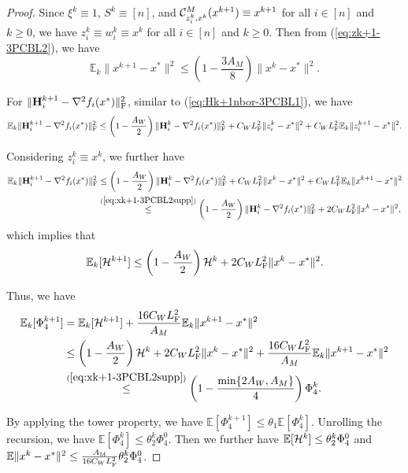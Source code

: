 \documentclass[11pt]{article}
\begin{document}
	
	\begin{proof}
		
		Since $\xi^k\equiv 1$, $S^k \equiv [n]$, and ${\mathcal{C}}^M_{z_i^k, x^k}(x^{k+1}) \equiv x^{k+1}$ for all $i\in [n]$ and $k\geq 0$, we have $z_i^k \equiv w_i^k \equiv x^k$ for all $i\in [n]$ and $k\geq 0$. Then from (\ref{eq:zk+1-3PCBL2}), we have 
		\begin{equation}\label{eq:xk+1-3PCBL2supp}
			\mathbb{E}_k\|x^{k+1}-x^*\|^2 \leq \left(  1 - \frac{3A_M}{8}  \right) \|x^k-x^*\|^2. 
		\end{equation}
		
		
		For $\|\mathbf{H}_i^{k+1} - \nabla^2 f_i(x^*)\|_{\rm F}^2$, similar to (\ref{eq:Hk+1nbor-3PCBL1}), we have 
		$$
		\mathbb{E}_k \|\mathbf{H}_i^{k+1} - \nabla^2 f_i(x^*)\|_{\rm F}^2 \leq \left(  1 - \frac{A_W}{2}  \right) \|\mathbf{H}_i^k - \nabla^2 f_i(x^*)\|_{\rm F}^2 + C_W L_{\rm F}^2 \|z_i^k-x^*\|^2 + C_W L_{\rm F}^2 \mathbb{E}_k\|z_i^{k+1}-x^*\|^2. 
		$$
		
		Considering $z_i^k \equiv x^k$, we further have 
		\begin{align*}
			\mathbb{E}_k \|\mathbf{H}_i^{k+1} - \nabla^2 f_i(x^*)\|_{\rm F}^2 & \leq \left(  1 - \frac{A_W}{2}  \right) \|\mathbf{H}_i^k - \nabla^2 f_i(x^*)\|_{\rm F}^2 + C_W L_{\rm F}^2 \|x^k-x^*\|^2 + C_W L_{\rm F}^2 \mathbb{E}_k\|x^{k+1}-x^*\|^2 \\ 
			& \overset{(\ref{eq:xk+1-3PCBL2supp})}{\leq} \left(  1 - \frac{A_W}{2}  \right) \|\mathbf{H}_i^k - \nabla^2 f_i(x^*)\|_{\rm F}^2 + 2 C_W L_{\rm F}^2 \|x^k-x^*\|^2, 
		\end{align*}
		which implies that 
		\begin{equation}\label{eq:Gk+1-3PCBL2}
			\mathbb{E}_k [{\cal H}^{k+1}] \leq \left(  1 - \frac{A_W}{2}  \right) {\cal H}^k + 2C_WL_{\rm F}^2 \|x^k-x^*\|^2. 
		\end{equation}
		
		
		Thus, we have 
		\begin{align*}
			\mathbb{E}_k[\Phi_4^{k+1}] & = \mathbb{E}_k [{\cal H}^{k+1}] + \frac{16C_WL_{\rm F}^2}{A_M} \mathbb{E}_k\|x^{k+1}-x^*\|^2 \\ 
			& \leq \left(  1 - \frac{A_W}{2}  \right) {\cal H}^k + 2C_WL_{\rm F}^2 \|x^k-x^*\|^2 + \frac{16C_WL_{\rm F}^2}{A_M} \mathbb{E}_k\|x^{k+1}-x^*\|^2 \\ 
			& \overset{(\ref{eq:xk+1-3PCBL2supp})}{\leq} \left(  1 - \frac{\min\{  2A_W, A_M  \}}{4}  \right) \Phi_4^k. 
		\end{align*}
		
		By applying the tower property, we have $\mathbb{E}[\Phi_4^{k+1}] \leq \theta_1 \mathbb{E}[\Phi_4^k]$. Unrolling the recursion, we have $\mathbb{E}[\Phi_4^k] \leq \theta_2^k \Phi_4^0$. Then we further have $\mathbb{E}[{\cal H}^k] \leq \theta_2^k \Phi_4^0$ and $\mathbb{E}\|x^k-x^*\|^2 \leq \frac{A_{\rm M}}{16C_WL_{\rm F}^2} \theta_2^k \Phi_4^0$.
		

\end{proof}
\end{document}
